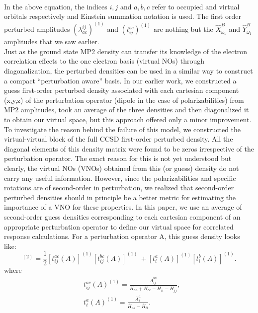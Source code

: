 \\
In the above equation, the indices $i,j$ and $a,b,c$ refer to occupied and virtual orbitals respectively
and Einstein summation notation is used. The first order perturbed amplitudes $(\lambda^{ij}_{ac})^{(1)}$ 
and $(t^{bc}_{ij})^{(1)}$ are nothing but the $\hat{X}^{B}_{\omega_1}$ and $\hat{Y}^{B}_{\omega_1}$ 
amplitudes that we saw earlier.\\ Just as the ground state MP2 density can transfer its knowledge of 
the electron correlation effects to the one electron basis (virtual NOs) through diagonalization, 
the perturbed densities can be used in a similar way to construct a compact ``perturbation aware''
basis. In our earlier work, we constructed a guess first-order perturbed density associated  
with each cartesian component (x,y,z) of the perturbation operator (dipole in the case of polarizabilities)
from MP2 amplitudes, took an average of the three densities and then diagonalized it to obtain our 
virtual space, but this approach offered only a minor improvement\cite{Kumar17}.
To investigate the reason behind the failure of this model, we constructed the virtual-virtual
block of the full CCSD first-order perturbed density. All the diagonal elements of this density 
matrix were found to be zeros irrespective of the perturbation operator. The exact reason for this
is not yet understood but clearly, the virtual NOs (VNOs) obtained from this (or guess) density 
do not carry any useful information. However, since the polarizabilities and specific rotations are 
of second-order in perturbation, we realized that second-order perturbed densities should in principle be a better 
metric for estimating the importance of a VNO for these properties.
In this paper, we use an average of second-order guess densities corresponding to each cartesian
component of an appropriate perturbation operator to define our virtual space 
for correlated response calculations. For a perturbation operator A, this guess density looks like:
\\
\begin{equation}
[{D^A_{ab}}]^{(2)} = \frac{1}{2}[t^{ac}_{ij}(A)]^{(1)}[t^{bc}_{ij}(A)]^{(1)} \
+ [t^{a}_{i}(A)]^{(1)} [t^{b}_{i}(A)]^{(1)}.
\end{equation}
where
\begin{equation}
\begin{split}
& t^{ac}_{ij}(A)^{(1)} = \frac{\bar{A}^{ac}_{ij}}{\overbar{H}_{aa} + \overbar{H}_{cc} - \overbar{H}_{ii} - \overbar{H}_{jj}},\\
& t^{a}_{i}(A)^{(1)} = \frac{\bar{A}^{a}_{i}}{\overbar{H}_{aa} - \overbar{H}_{ii}}.\\
\end{split}
\end{equation}
